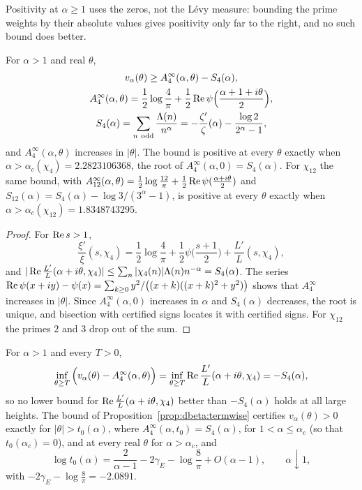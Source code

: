 Positivity at $\alpha\ge1$ uses the zeros, not the L\'evy measure: bounding the prime weights by their absolute values gives positivity only far to the right, and no such bound does better.

\begin{proposition}\label{prop:dbeta:termwise}
For $\alpha>1$ and real $\theta$,
\begin{gather*}
v_\alpha(\theta)\ge A^\infty_4(\alpha,\theta)-S_4(\alpha),\\
A^\infty_4(\alpha,\theta)=\frac12\log\frac4\pi+\frac12\re\psi\Big(\frac{\alpha+1+i\theta}2\Big),\\
S_4(\alpha)=\sum_{n\ \mathrm{odd}}\frac{\Lambda(n)}{n^\alpha}=-\frac{\zeta'}\zeta(\alpha)-\frac{\log2}{2^\alpha-1},
\end{gather*}
and $A^\infty_4(\alpha,\theta)$ increases in $|\theta|$. The bound is positive at every $\theta$ exactly when $\alpha>\alpha_c(\chi_4)=2.2823106368$, the root of $A^\infty_4(\alpha,0)=S_4(\alpha)$. For $\chi_{12}$ the same bound, with $A^\infty_{12}(\alpha,\theta)=\frac12\log\frac{12}\pi+\frac12\operatorname{Re}\psi(\frac{\alpha+i\theta}2)$ and $S_{12}(\alpha)=S_4(\alpha)-\log3/(3^\alpha-1)$, is positive at every $\theta$ exactly when $\alpha>\alpha_c(\chi_{12})=1.8348743295$.
\end{proposition}

\begin{proof}
For $\operatorname{Re} s>1$,
\[
\frac{\xi'}\xi(s,\chi_4)=\frac12\log\frac4\pi+\frac12\psi\Big(\frac{s+1}2\Big)+\frac{L'}L(s,\chi_4),
\]
and $|\operatorname{Re}\frac{L'}L(\alpha+i\theta,\chi_4)|\le\sum_n|\chi_4(n)|\Lambda(n)n^{-\alpha}=S_4(\alpha)$. The series $\operatorname{Re}\psi(x+iy)-\psi(x)=\sum_{k\ge0}y^2/\big((x+k)((x+k)^2+y^2)\big)$ shows that $A^\infty_4$ increases in $|\theta|$. Since $A^\infty_4(\alpha,0)$ increases in $\alpha$ and $S_4(\alpha)$ decreases, the root is unique, and bisection with certified signs locates it with certified signs. For $\chi_{12}$ the primes $2$ and $3$ drop out of the sum.
\end{proof}

\begin{proposition}\label{prop:dbeta:kron}
For $\alpha>1$ and every $T>0$,
\[
\inf_{\theta\ge T}\Big(v_\alpha(\theta)-A^\infty_4(\alpha,\theta)\Big)=\inf_{\theta\ge T}\operatorname{Re}\frac{L'}L(\alpha+i\theta,\chi_4)=-S_4(\alpha),
\]
so no lower bound for $\operatorname{Re}\frac{L'}L(\alpha+i\theta,\chi_4)$ better than $-S_4(\alpha)$ holds at all large heights. The bound of Proposition~\ref{prop:dbeta:termwise} certifies $v_\alpha(\theta)>0$ exactly for $|\theta|>t_0(\alpha)$, where $A^\infty_4(\alpha,t_0)=S_4(\alpha)$, for $1<\alpha\le\alpha_c$ (so that $t_0(\alpha_c)=0$), and at every real $\theta$ for $\alpha>\alpha_c$, and
\[
\log t_0(\alpha)=\frac2{\alpha-1}-2\gamma_E-\log\frac8\pi+O(\alpha-1),\qquad\alpha\downarrow1,
\]
with $-2\gamma_E-\log\frac8\pi=-2.0891$.
\end{proposition}

